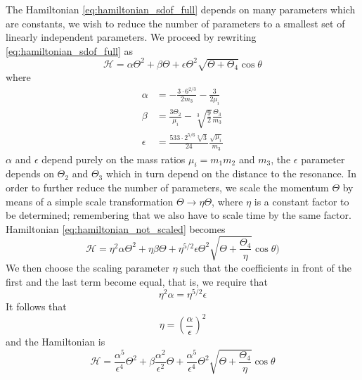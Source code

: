 \documentclass[ twoside,openright,titlepage,numbers=noenddot,headinclude,%
                footinclude=true,cleardoublepage=empty,abstractoff, %
                BCOR=5mm,paper=a4,fontsize=11pt,%
                american,%
                ]{scrreprt}
\begin{document}
The Hamiltonian \ref{eq:hamiltonian_sdof_full} depends on many parameters
which are constants, we wish to reduce the number of parameters to a 
smallest set of linearly independent parameters. We proceed by rewriting
\cref{eq:hamiltonian_sdof_full} as
\begin{equation}
    \mathcal{H}=\alpha\Theta^2+\beta\Theta +\epsilon\Theta^2\sqrt{\Theta+\Theta_4}
    \cos\theta
    \label{eq:hamiltonian_not_scaled}
\end{equation}
where
\begin{equation}
    \begin{aligned}
        \alpha&= - \frac{3\cdot 6^{2/3}}{2m_3} - \frac{3}{2\mu_i}\\
        \beta&=\frac{3\Theta_2 }{\mu_i}
          -\sqrt[3]{\frac{9}{2}}\frac{\Theta_3}{m_3} \\
         \epsilon&=\frac{533\cdot 2^{5/6}\sqrt[3]{3}}{24} 
        \frac{\sqrt{\mu_i}}{m_3}    
    \end{aligned}
\end{equation}
$\alpha$ and $\epsilon$ depend purely on the mass ratios $\mu_i=m_1m_2$ and
$m_3$, the $\epsilon$ parameter depends on $\Theta_2$ and $\Theta_3$ which in
turn depend on the distance to the resonance. In order to further reduce the 
number of parameters, we scale the momentum $\Theta$ by means of a 
simple scale transformation $\Theta\rightarrow\eta\Theta$, where
$\eta$ is a constant factor to be determined;
remembering that we also have to scale time by the same factor. 
Hamiltonian \ref{eq:hamiltonian_not_scaled} becomes
\begin{equation}
    \mathcal{H}=\eta^2\alpha\Theta^2+\eta\beta\Theta +
    \eta^{5/2}\epsilon\Theta^2\sqrt{\Theta+ \frac{\Theta_4}{\eta}}
    \cos\theta)
\end{equation}
We then choose the scaling parameter $\eta$ such that the coefficients
in front of the first and the last term become equal, that is,
we require that 
\begin{equation}
    \eta^2\alpha=\eta^{5/2}\epsilon
\end{equation}
It follows that 
\begin{equation}
    \eta=\left( \frac{\alpha}{\epsilon} \right)^2
\end{equation}
and the Hamiltonian is
  \begin{equation}
    \mathcal{H}= \frac{\alpha^5}{\epsilon^4} \Theta^2+
      \beta \frac{\alpha^2}{\epsilon^2} \Theta +
    \frac{\alpha^5}{\epsilon^4} \Theta^2\sqrt{\Theta+ \frac{\Theta_4}{\eta}}
    \cos\theta
\end{equation}
\end{document}
